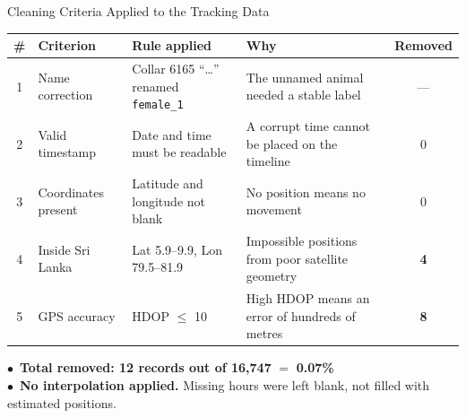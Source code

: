 \documentclass{beamer}
\newcommand{\hi}[1]{\textbf{\textcolor{hicolor}{#1}}}
\newcommand{\key}[1]{\textcolor{kgreen}{\bfseries #1}}
\begin{document}
	\begin{frame}{Cleaning Criteria Applied to the Tracking Data}
		\vspace{0.2em}
		\centering
		\tiny
		\begin{tabular}{@{}c>{\raggedright\arraybackslash}p{2.3cm}>{\raggedright\arraybackslash}p{3.2cm}>{\raggedright\arraybackslash}p{3.0cm}c@{}}
			\toprule
			\rowcolor{lightemerald}
			\textbf{\#} & \textbf{Criterion} & \textbf{Rule applied} & \textbf{Why} & \textbf{Removed} \\
			\midrule
			1 & Name correction & Collar 6165 ``\ldots'' renamed \texttt{female\_1} & The unnamed animal needed a stable label & --- \\
			2 & Valid timestamp & Date and time must be readable & A corrupt time cannot be placed on the timeline & 0 \\
			3 & Coordinates present & Latitude and longitude not blank & No position means no movement & 0 \\
			4 & Inside Sri Lanka & Lat 5.9--9.9, Lon 79.5--81.9 & Impossible positions from poor satellite geometry & \hi{4} \\
			5 & GPS accuracy & HDOP $\leq$ 10 & High HDOP means an error of hundreds of metres & \hi{8} \\
			\bottomrule
		\end{tabular}
		
		\vspace{0.8em}
		\raggedright
		{\scriptsize
			$\bullet$~\key{Total removed: 12 records out of 16,747} $=$ \key{0.07\%}\\[3pt]
			$\bullet$~\key{No interpolation applied.} Missing hours were left blank, not filled
			with estimated positions.}
		
	\end{frame}
	
\end{document}
